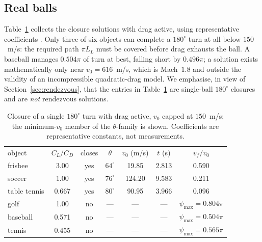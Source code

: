 \documentclass[aip,amsmath,amssymb,preprint,floatfix]{revtex4-2}
\newcommand{\LL}{L_{L}}
\begin{document}
\subsection{Real balls}

Table~\ref{tab:balls} collects the closure solutions with drag active, using
representative coefficients \cite{Mehta1985,Nathan2008,KensrudSmith2018}. Only three
of six objects can complete a $180^\circ$ turn at all below $150$~m/s: the required
path $\pi\LL$ must be covered before drag exhausts the ball. A baseball manages
$0.504\pi$ of turn at best, falling short by $0.496\pi$; a solution exists
mathematically only near $v_0=616$~m/s, which is Mach~$1.8$ and outside the validity
of an incompressible quadratic-drag model. We emphasise, in view of
Section~\ref{sec:rendezvous}, that the entries in Table~\ref{tab:balls} are
single-ball $180^\circ$ closures and are \emph{not} rendezvous solutions.

\begin{table}[t]
\caption{Closure of a single $180^\circ$ turn with drag active, $v_0$ capped at
$150$~m/s; the minimum-$v_0$ member of the $\theta$-family is shown. Coefficients are
representative constants, not measurements.}
\label{tab:balls}
\begin{ruledtabular}
\begin{tabular}{lcccccc}
object & $C_L/C_D$ & closes & $\theta$ & $v_0$ (m/s) & $t$ (s) & $v_f/v_0$ \\
\colrule
frisbee   & 3.00  & yes & $64^\circ$ & 19.85  & 2.813 & 0.590 \\
soccer    & 1.00  & yes & $76^\circ$ & 124.20 & 9.583 & 0.211 \\
table tennis & 0.667 & yes & $80^\circ$ & 90.95  & 3.966 & 0.096 \\
golf      & 1.00  & no  & --- & --- & --- & $\psi_{\max}=0.804\pi$ \\
baseball  & 0.571 & no  & --- & --- & --- & $\psi_{\max}=0.504\pi$ \\
tennis    & 0.455 & no  & --- & --- & --- & $\psi_{\max}=0.565\pi$ \\
\end{tabular}
\end{ruledtabular}
\end{table}
\end{document}
